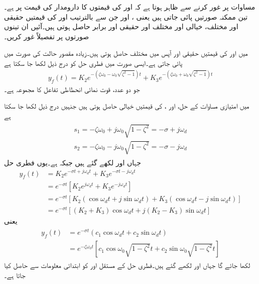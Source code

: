 مساوات  پر غور کرنے سے ظاہر ہوتا ہے کہ  اور  کی قیمتوں کا دارومدار  کی قیمت پر ہے۔تین ممکنہ صورتیں پائی جاتی ہیں یعنی ،  اور  جن سے بالترتیب  اور  کی قیمتیں حقیقی اور مختلف، خیالی اور مختلف اور حقیقی اور برابر حاصل ہوتی ہیں۔آئیں ان تینوں صورتوں پر تفصیلاً غور کریں۔

 میں  اور  کی قیمتیں حقیقی اور آپس میں مختلف حاصل ہوتی ہیں۔زیادہ مقصور حالت  کی صورت میں پائی جاتی ہے۔ایسی صورت میں فطری حل کو درج ذیل لکھا جا سکتا ہے
\begin{align}\label{مساوات_عارضی_فطری_زیادہ_مقصور_حل}
y_f(t)=K_2 e^{-(\zeta\omega_0- \omega_0\sqrt{\zeta^2-1})t}+K_3 e^{-(\zeta\omega_0+ \omega_0\sqrt{\zeta^2-1})t}
\end{align}
جو دو عدد، قوت نمائی انحطاطی تفاعل  کا مجموعہ ہے۔

   میں امتیازی مساوات کے حل،  اور ،  کی قیمتیں خیالی حاصل ہوتی ہیں جنہیں درج ذیل لکھا جا سکتا ہے
\begin{gather}
\begin{aligned}
s_1=-\zeta\omega_0+ j\omega_0\sqrt{1-\zeta^2}=-\sigma+j \omega_d\\
s_2=-\zeta\omega_0- j\omega_0\sqrt{1-\zeta^2}=-\sigma-j\omega_d
\end{aligned}
\end{gather}
جہاں  اور  لکھے گئے ہیں جبکہ  ہے۔یوں فطری حل
\begin{align*}
y_f(t)&=K_2e^{-\sigma t+j\omega_d t}+K_3e^{-\sigma t -j \omega_d t}\\
&=e^{-\sigma t} \left[K_2 e^{j \omega_d t}+K_3 e^{-j \omega_d t}\right]\\
&=e^{-\sigma t} \left[K_2(\cos \omega_d t + j \sin \omega_d t)+K_3(\cos \omega_d t -j \sin \omega_d t)\right]\\
&=e^{-\sigma t} \left[(K_2+K_3)\cos \omega_d t+j(K_2-K_3)\sin \omega_d t\right]
\end{align*}
یعنی
\begin{gather}
\begin{aligned}\label{مساوات_عارضی_فطری_حل_کم_تقصیر_الف}
y_f(t)&=e^{-\sigma t} \left(c_1 \cos \omega_d t +c_2 \sin \omega_d t\right)\\
&=e^{-\zeta\omega_0 t}\left[c_1 \cos \omega_0\sqrt{1-\zeta^2} t+c_2 \sin \omega_0 \sqrt{1-\zeta^2} t\right]
\end{aligned}
\end{gather}
لکھا جائے گا جہاں  اور  لکھے گئے ہیں۔فطری حل کے مستقل  اور  کو ابتدائی معلومات سے حاصل کیا جاتا ہے۔

